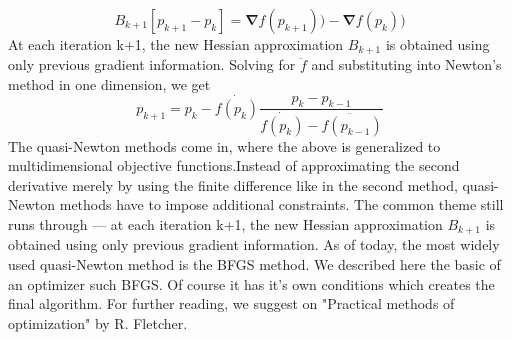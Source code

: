\documentclass[12pt, a4paper]{article}
\begin{document}
    \begin{equation}
        B_{k+1}[p_{k+1}-p_{k}] = \mathbf{\nabla}f(p_{k+1})) -\mathbf{\nabla}f(p_{k}))
    \end{equation}
    At each iteration k+1, the new Hessian approximation $B_{k+1}$ is obtained using only previous gradient information. Solving for $\ddot{f}$ and substituting into Newton’s method in one dimension, we get
    \begin{equation}\label{}
    p_{k+1} = p_k - \dot{f(p_k)}\dfrac{p_k - p_{k-1}}{\dot{f(p_k)} - \ddot{f(p_{k-1})}}
    \end{equation}
    The quasi-Newton methods come in, where the above is generalized to multidimensional objective functions.Instead of approximating the second derivative merely by using the finite difference like in the second method, quasi-Newton methods have to impose additional constraints. The common theme still runs through — at each iteration k+1, the new Hessian approximation $B_{k+1}$ is obtained using only previous gradient information.
    As of today, the most widely used quasi-Newton method is the BFGS method. We described here the basic of an optimizer such BFGS. Of course it has it's own conditions which creates the final algorithm. For further reading, we suggest on "Practical methods of optimization" by R. Fletcher.
\end{document}
